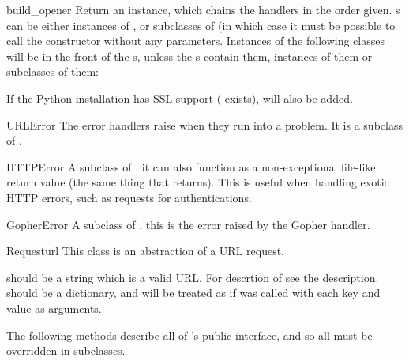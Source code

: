 \begin{funcdesc}{build_opener}{}
Return an  instance, which chains the
handlers in the order given. s can be either instances
of , or subclasses of  (in
which case it must be possible to call the constructor without
any parameters. Instances of the following classes will be in
the front of the s, unless the s contain
them, instances of them or subclasses of them:


If the Python installation has SSL support ( exists),
 will also be added.
\end{funcdesc}

\begin{excdesc}{URLError}
The error handlers raise when they run into a problem. It is a subclass
of .
\end{excdesc}

\begin{excdesc}{HTTPError}
A subclass of , it can also function as a 
non-exceptional file-like return value (the same thing that 
returns). This is useful when handling exotic HTTP errors, such as
requests for authentications.
\end{excdesc}

\begin{excdesc}{GopherError}
A subclass of , this is the error raised by the
Gopher handler.
\end{excdesc}

\begin{classdesc}{Request}{url}
This class is an abstraction of a URL request.

 should be a string which is a valid URL. For descrtion
of  see the  description.
 should be a dictionary, and will be treated as if
 was called with each key and value as arguments.
\end{classdesc}

The following methods describe all of 's public interface,
and so all must be overridden in subclasses.

